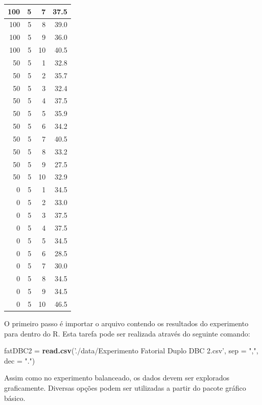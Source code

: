 \documentclass[
]{article}
\newenvironment{Shaded}{\begin{snugshade}}{\end{snugshade}}
\newcommand{\DataTypeTok}[1]{\textcolor[rgb]{0.13,0.29,0.53}{#1}}
\newcommand{\KeywordTok}[1]{\textcolor[rgb]{0.13,0.29,0.53}{\textbf{#1}}}
\newcommand{\NormalTok}[1]{#1}
\newcommand{\StringTok}[1]{\textcolor[rgb]{0.31,0.60,0.02}{#1}}
\begin{document}
\begin{table}
\begin{tabular}[t]{r|r|r|r}
100 & 5 & 7 & 37.5\\
\hline
100 & 5 & 8 & 39.0\\
\hline
100 & 5 & 9 & 36.0\\
\hline
100 & 5 & 10 & 40.5\\
\hline
50 & 5 & 1 & 32.8\\
\hline
50 & 5 & 2 & 35.7\\
\hline
50 & 5 & 3 & 32.4\\
\hline
50 & 5 & 4 & 37.5\\
\hline
50 & 5 & 5 & 35.9\\
\hline
50 & 5 & 6 & 34.2\\
\hline
50 & 5 & 7 & 40.5\\
\hline
50 & 5 & 8 & 33.2\\
\hline
50 & 5 & 9 & 27.5\\
\hline
50 & 5 & 10 & 32.9\\
\hline
0 & 5 & 1 & 34.5\\
\hline
0 & 5 & 2 & 33.0\\
\hline
0 & 5 & 3 & 37.5\\
\hline
0 & 5 & 4 & 37.5\\
\hline
0 & 5 & 5 & 34.5\\
\hline
0 & 5 & 6 & 28.5\\
\hline
0 & 5 & 7 & 30.0\\
\hline
0 & 5 & 8 & 34.5\\
\hline
0 & 5 & 9 & 34.5\\
\hline
0 & 5 & 10 & 46.5\\
\hline
\end{tabular}
\end{table}

O primeiro passo é importar o arquivo contendo os resultados do experimento para dentro do R. Esta tarefa pode ser realizada através do seguinte comando:

\begin{Shaded}
\begin{Highlighting}[]
\NormalTok{fatDBC2 =}\StringTok{ }\KeywordTok{read.csv}\NormalTok{(}\StringTok{'./data/Experimento Fatorial Duplo DBC 2.csv'}\NormalTok{, }
                   \DataTypeTok{sep =} \StringTok{","}\NormalTok{, }\DataTypeTok{dec =} \StringTok{"."}\NormalTok{)}
\end{Highlighting}
\end{Shaded}

Assim como no experimento balanceado, os dados devem ser explorados graficamente. Diversas opções podem ser utilizadas a partir do pacote gráfico básico.
\end{document}
